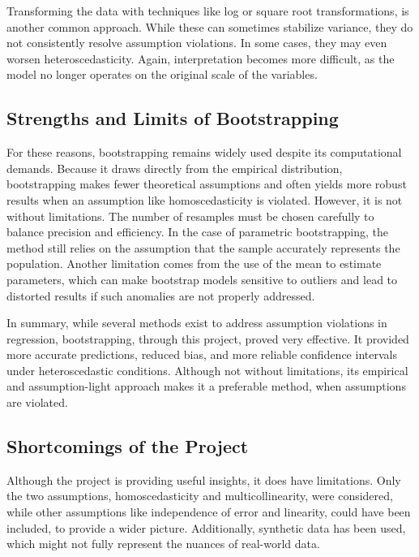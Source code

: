 \noindent Transforming the data with techniques like log or square root transformations, is another common approach. While these can sometimes stabilize variance, they do not consistently resolve assumption violations. In some cases, they may even worsen heteroscedasticity. Again, interpretation becomes more difficult, as the model no longer operates on the original scale of the variables.


\subsection{Strengths and Limits of Bootstrapping}
For these reasons, bootstrapping remains widely used despite its computational demands. Because it draws directly from the empirical distribution, bootstrapping makes fewer theoretical assumptions and often yields more robust results when an assumption like homoscedasticity is violated. However, it is not without limitations. The number of resamples must be chosen carefully to balance precision and efficiency. In the case of parametric bootstrapping, the method still relies on the assumption that the sample accurately represents the population. Another limitation comes from the use of the mean to estimate parameters, which can make bootstrap models sensitive to outliers and lead to distorted results if such anomalies are not properly addressed.

\noindent In summary, while several methods exist to address assumption violations in regression, bootstrapping, through this project, proved very effective. It provided more accurate predictions, reduced bias, and more reliable confidence intervals under heteroscedastic conditions. Although not without limitations, its empirical and assumption-light approach makes it a preferable method, when assumptions are violated.

\subsection{Shortcomings of the Project}
Although the project is providing useful insights, it does have limitations. Only the two assumptions, homoscedasticity and multicollinearity, were considered, while other assumptions like independence of error and linearity, could have been included, to provide a wider picture. Additionally, synthetic data has been used, which	might not fully represent the nuances of real-world data.
